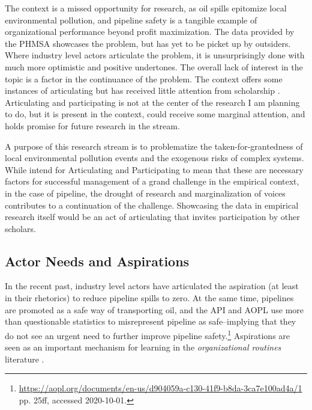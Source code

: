\documentclass{article}
\begin{document}
The context is a missed opportunity for research, as oil spills epitomize local environmental pollution, and pipeline safety is a tangible example of organizational performance beyond profit maximization. The data provided by the PHMSA showcases the problem, but has yet to be picket up by outsiders. Where industry level actors articulate the problem, it is unsurprisingly done with much more optimistic and positive undertones. The overall lack of interest in the topic is a factor in the continuance of the problem. The context offers some instances of articulating but has received little attention from scholarship \citep[the exception being][]{Estes2019}. Articulating and participating is not at the center of the research I am planning to do, but it is present in the context, could receive some marginal attention, and holds promise for future research in the stream.

A purpose of this research stream is to problematize the taken-for-grantedness of local environmental pollution events and the exogenous risks of complex systems. While \citet{George2016} intend for Articulating and Participating to mean that these are necessary factors for successful management of a grand challenge in the empirical context, in the case of pipeline, the drought of research and marginalization of voices contributes to a continuation of the challenge. Showcasing the data in empirical research itself would be an act of articulating that invites participation by other scholars.


\subsection*{Actor Needs and Aspirations}

In the recent past, industry level actors have articulated the aspiration (at least in their rhetorics) to reduce pipeline spills to zero. At the same time, pipelines are promoted as a safe way of transporting oil, and the API and AOPL use more than questionable statistics to misrepresent pipeline as safe--implying that they do not see an urgent need to further improve pipeline safety.\footnote{\url{https://aopl.org/documents/en-us/d904059a-c130-41f9-b8da-3ca7e100ad4a/1} pp. 25ff, accessed 2020-10-01.} Aspirations are seen as an important mechanism for learning in the \textit{organizational routines} literature \citep{Baum2007}.
\end{document}
